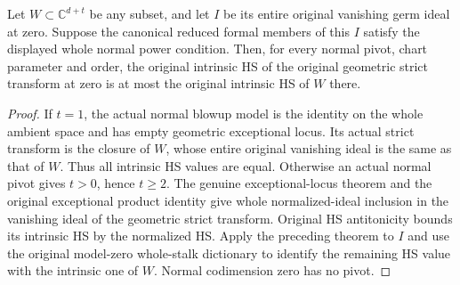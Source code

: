 \begin{theorem}
\label{hir:actual-reduced-centre-geometric-bennett}
\leanok
Let $W\subset\mathbb C^{d+t}$ be any subset, and let $I$ be its
entire original vanishing germ ideal at zero. Suppose the canonical
reduced formal members of this $I$ satisfy the displayed whole normal
power condition. Then, for every normal pivot, chart parameter and
order, the original intrinsic HS of the original geometric strict
transform at zero is at most the original intrinsic HS of $W$ there.
\end{theorem}
\begin{proof}
If $t=1$, the actual normal blowup model is the identity on the whole
ambient space and has empty geometric exceptional locus. Its actual
strict transform is the closure of $W$, whose entire original
vanishing ideal is the same as that of $W$. Thus all intrinsic HS
values are equal. Otherwise an actual normal pivot gives $t>0$, hence
$t\ge2$. The genuine exceptional-locus theorem and the original
exceptional product identity give whole normalized-ideal inclusion in
the vanishing ideal of the geometric strict transform. Original HS
antitonicity bounds its intrinsic HS by the normalized HS. Apply the
preceding theorem to $I$ and use the original model-zero whole-stalk
dictionary to identify the remaining HS value with the intrinsic one
of $W$. Normal codimension zero has no pivot.
\end{proof}
